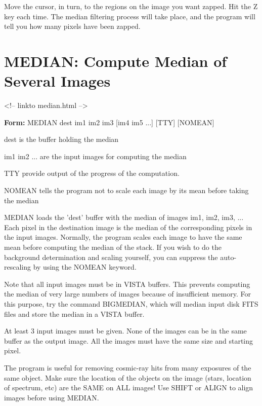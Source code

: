 Move the cursor, in turn, to the regions on the image you want zapped.  Hit
the Z key each time.  The median filtering process will take place, and the
program will tell you how many pixels have been zapped.

\section{MEDIAN: Compute Median of Several Images}
\begin{rawhtml}
<!-- linkto median.html -->
\end{rawhtml}

\begin{command}
  \item[\textbf{Form: }MEDIAN dest im1 im2 im3 {[im4 im5 ...]} {[TTY]} 
       {[NOMEAN]}\hfill]{}
  \item[dest]{is the buffer holding the median}
  \item[im1 im2 ...]{are the input images for computing the median}
  \item[TTY]{provide output of the progress of the computation.}
  \item[NOMEAN]{tells the program not to scale each image by
       its mean before taking the median}
\end{command}

MEDIAN loads the 'dest' buffer with the median of images im1, im2, im3, ...
Each pixel in the destination image is the median of the corresponding
pixels in the input images. Normally, the program scales each image to have
the same mean before computing the median of the stack. If you wish to do
the background determination and scaling yourself, you can suppress the
auto-rescaling by using the NOMEAN keyword.

Note that all input images must be in VISTA buffers. This prevents
computing the median of very large numbers of images because of insufficient memory.  For
this purpose, try the command BIGMEDIAN, which will median input disk FITS
files and store the median in a VISTA buffer.

At least 3 input images must be given.  None of the images can be in the
same buffer as the output image.  All the images must have the same size
and starting pixel.

The program is useful for removing cosmic-ray hits from many exposures of
the same object.  Make sure the location of the objects on the image
(stars, location of spectrum, etc) are the SAME on ALL images!  Use SHIFT
or ALIGN to align images before using MEDIAN.

